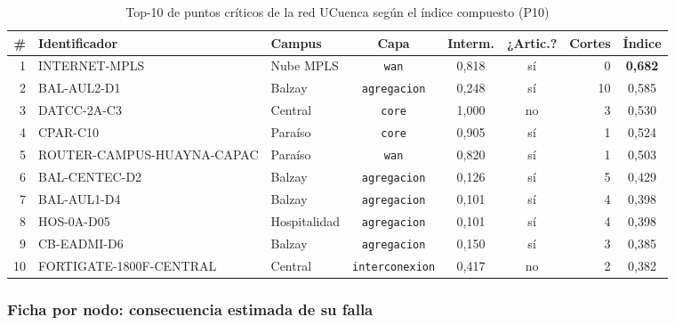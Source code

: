 \documentclass[10pt,a4paper]{extarticle}
\newcommand{\code}[1]{\texttt{\small #1}}
\begin{document}
\begin{table}[H]
\centering
\caption{Top-10 de puntos críticos de la red UCuenca según el índice compuesto (P10)}
\label{tab:ranking}
\small
\begin{adjustbox}{max width=\textwidth}
\begin{tabular}{rllcccrc}
\toprule
\# & \textbf{Identificador} & \textbf{Campus} & \textbf{Capa} & \textbf{Interm.} & \textbf{¿Artic.?} & \textbf{Cortes} & \textbf{Índice} \\
\midrule
1  & INTERNET-MPLS              & Nube MPLS      & \code{wan}          & 0,818 & sí & 0  & \textbf{0,682} \\
2  & BAL-AUL2-D1                & Balzay         & \code{agregacion}   & 0,248 & sí & 10 & 0,585 \\
3  & DATCC-2A-C3                & Central        & \code{core}         & 1,000 & no & 3  & 0,530 \\
4  & CPAR-C10                   & Paraíso        & \code{core}         & 0,905 & sí & 1  & 0,524 \\
5  & ROUTER-CAMPUS-HUAYNA-CAPAC & Paraíso        & \code{wan}          & 0,820 & sí & 1  & 0,503 \\
6  & BAL-CENTEC-D2              & Balzay         & \code{agregacion}   & 0,126 & sí & 5  & 0,429 \\
7  & BAL-AUL1-D4                & Balzay         & \code{agregacion}   & 0,101 & sí & 4  & 0,398 \\
8  & HOS-0A-D05                 & Hospitalidad   & \code{agregacion}   & 0,101 & sí & 4  & 0,398 \\
9  & CB-EADMI-D6                & Balzay         & \code{agregacion}   & 0,150 & sí & 3  & 0,385 \\
10 & FORTIGATE-1800F-CENTRAL    & Central        & \code{interconexion}& 0,417 & no & 2  & 0,382 \\
\bottomrule
\end{tabular}
\end{adjustbox}
\end{table}

\subsubsection{Ficha por nodo: consecuencia estimada de su falla}
\end{document}
